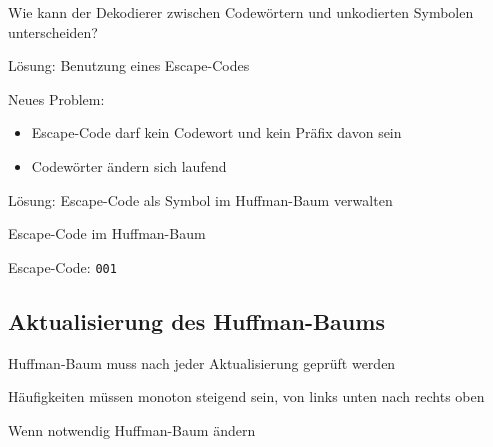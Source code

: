\documentclass[xcolor=dvipsnames,presentation]{beamer}    %
\newenvironment{witemize}{\itemize\setlength{\itemsep}{1em}}{\enditemize}
\begin{document}
\begin{frame}[<+->]{\insertsection}
  \begin{witemize}
    \item Wie kann der Dekodierer zwischen Codewörtern und unkodierten
      Symbolen unterscheiden?
    \item Lösung: Benutzung eines Escape-Codes
    \item Neues Problem:
      \begin{itemize}
      \item Escape-Code darf kein Codewort und kein Präfix davon sein
      \item Codewörter ändern sich laufend
      \end{itemize}
    \item Lösung: Escape-Code als Symbol im Huffman-Baum verwalten
  \end{witemize}
\end{frame}

\begin{frame}[<+->]{Escape-Code im Huffman-Baum}
\begin{figure}
\end{figure}
Escape-Code: {\tt001}
\end{frame}

\subsection{Aktualisierung des Huffman-Baums}

\begin{frame}[<+->]{\insertsubsection}
  \begin{witemize}
  \item Huffman-Baum muss nach jeder Aktualisierung geprüft werden
    \item Häufigkeiten müssen monoton steigend sein, von links unten nach
      rechts oben
  \item Wenn notwendig Huffman-Baum ändern
  \end{witemize}
\end{frame}
\end{document}
